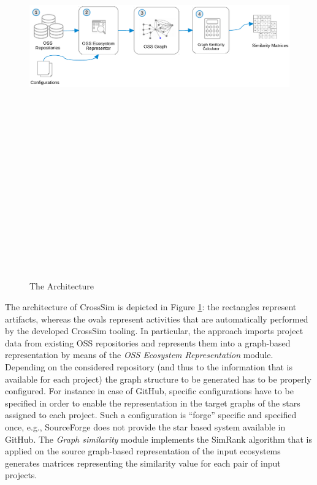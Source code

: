  \begin{figure}[!h]
 	\includegraphics[width=15cm,height=20cm,keepaspectratio]{images/CrossSim.pdf}
 	\caption{The \CrossSim Architecture}
 	\label{fig:CrossSim}
 \end{figure}
 
The architecture of CrossSim is depicted in Figure \ref{fig:CrossSim}: the rectangles represent artifacts, whereas the ovals represent activities that are automatically performed by the developed CrossSim tooling. In particular, the approach imports project data from existing OSS repositories and represents them into a graph-based representation by means of the \emph{OSS Ecosystem Representation} module. Depending on the considered repository (and thus to the information that is available for each project) the graph structure to be generated has to be properly configured. For instance in case of GitHub, specific configurations have to be specified in order to enable the representation in the target graphs of the stars assigned to each project. Such a configuration is ``forge'' specific and specified once, e.g., SourceForge does not provide the star based system available in GitHub. 
The \emph{Graph similarity} module implements the SimRank algorithm \cite{Jeh:2002:SMS:775047.775126} that is applied on the source graph-based representation of the input ecosystems generates matrices representing the similarity value for each pair of input projects. 
 
